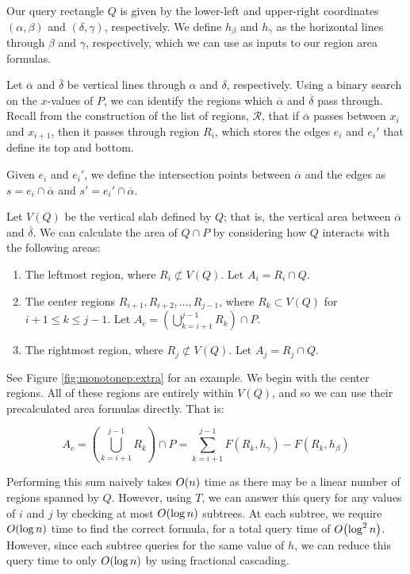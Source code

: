 Our query rectangle $Q$ is given by the lower-left and upper-right coordinates $(\alpha, \beta)$ and $(\delta, \gamma)$, respectively. We define $h_\beta$ and $h_\gamma$ as the horizontal lines through $\beta$ and $\gamma$, respectively, which we can use as inputs to our region area formulas.

Let $\overline{\alpha}$ and $\overline{\delta}$ be vertical lines through $\alpha$ and $\delta$, respectively. Using a binary search on the $x$-values of $P$, we can identify the regions which $\overline{\alpha}$ and $\overline{\delta}$ pass through. Recall from the construction of the list of regions, $\mathcal{R}$, that if $\overline{\alpha}$ passes between $x_i$ and $x_{i+1}$, then it passes through region $R_i$, which stores the edges $e_i$ and $e_i'$ that define its top and bottom.

Given $e_i$ and $e_i'$, we define the intersection points between $\overline{\alpha}$ and the edges as $s = e_i \cap \overline{\alpha}$ and $s' = e_i' \cap \overline{\alpha}$.

Let $V(Q)$ be the vertical slab defined by $Q$; that is, the vertical area between $\overline{\alpha}$ and $\overline{\delta}$. We can calculate the area of $Q \cap P$ by considering how $Q$ interacts with the following areas:

\begin{enumerate}
 \item The leftmost region, where $R_i \not \subset V(Q)$. Let $A_i = R_i \cap Q$.
 \item The center regions $R_{i+1}, R_{i+2}, \ldots, R_{j-1}$, where  $R_k \subset V(Q)$ for $i + 1 \leq k \leq j -1$. Let $A_c = \left ( \bigcup_{k=i+1}^{j-1}{R_k} \right ) \cap P $.
 \item The rightmost region, where $R_j \not \subset V(Q)$. Let $A_j = R_j \cap Q$. 
\end{enumerate}

See Figure \ref{fig:monotonep:extra} for an example. We begin with the center regions. All of these regions are entirely within $V(Q)$, and so we can use their precalculated area formulas directly. That is:

\[
A_c
= \left ( \bigcup_{k=i+1}^{j-1}{R_k} \right ) \cap P 
= \sum_{k=i+1}^{j-1} F(R_k, h_\gamma) - F(R_k, h_\beta)
\]

Performing this sum naively takes $O\!\left(n\right)$ time as there may be a linear number of regions spanned by $Q$.  However, using $T$, we can answer this query for any values of $i$ and $j$ by checking at most $O\!\left(\log{n}\right)$ subtrees. At each subtree, we require $O\!\left(\log{n}\right)$ time to find the correct formula, for a total query time of $O\!\left(\log^2{n}\right)$.  However, since each subtree queries for the same value of $h$, we can reduce this query time to only $O\!\left(\log{n}\right)$ by using fractional cascading.\cite{cg-fc-86, cg-fc2-86}

